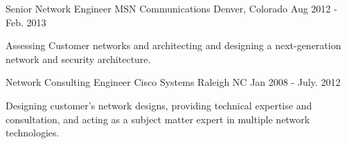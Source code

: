 \begin{cventries}
  \cventry
    {Senior Network Engineer} %
    {MSN Communications} %
    {Denver, Colorado} %
    {Aug 2012 - Feb. 2013} %
    {
      \begin{cvitems} %
        \item { Assessing Customer networks and architecting and designing a next-generation network and security architecture.}
      \end{cvitems}
    }

  \cventry
    {Network Consulting Engineer} %
    {Cisco Systems} %
    {Raleigh NC} %
    {Jan 2008 - July. 2012} %
    {
      \begin{cvitems} %
        \item {Designing customer’s network designs, providing technical expertise and consultation, and acting as a subject matter expert in multiple network technologies.}
      \end{cvitems}
    }

\end{cventries}
